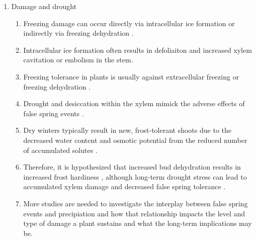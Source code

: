 \documentclass{article}\usepackage[]{graphicx}\usepackage[]{color}
\begin{document}
\begin{enumerate}
\item Damage and drought
\begin{enumerate}
\item Freezing damage can occur directly via intracellular ice formation or indirectly via freezing dehydration \citep{Pearce2001, Beck2004, Hofmann2015}.
\item Intracellular ice formation often results in defoliaiton and increased xylem cavitation or embolism in the stem.
\item Freezing tolerance in plants is usually against extracellular freezing or freezing dehydration \citep{Burke1976}.
\item Drought and desiccation within the xylem mimick the adverse effects of false spring events \citep{Cavender2015}.
\item Dry winters typically result in new, frost-tolerant shoots due to the decreased water content and osmotic potential from the reduced number of accumulated solutes \citep{Morin2007, Hofmann2015}.
\item Therefore, it is hypothesized that increased bud dehydration results in increased frost hardiness \citep{Beck2007, Nielsen2009, Poirier2010, Kathke2011, Hofmann2015}, although long-term drought stress can lead to accumulated xylem damage and decreased false spring tolerance \citep{Anderegg2013}.
\item More studies are needed to investigate the interplay between false spring events and precipiation and how that relationship impacts the level and type of damage a plant sustains and what the long-term implications may be. 
\end{enumerate}
\end{enumerate}

\end{document}
